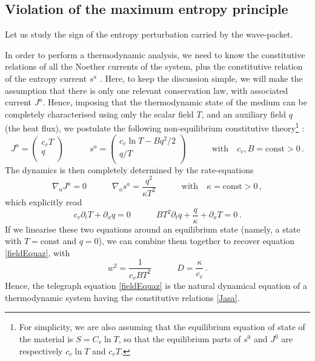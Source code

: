 \documentclass[a4paper, amsfonts, amssymb, amsmath, reprint, showkeys,  twoside, onecolumn,notitlepage,nofootinbib]{revtex4-1}
\newcommand{\spc}{\quad \quad \quad}
\theoremstyle{definition}
\theoremstyle{theorem}
\begin{document}
\subsection*{Violation of the maximum entropy principle}

Let us study the sign of the entropy perturbation carried by the wave-packet.

In order to perform a thermodynamic analysis, we need to know the constitutive relations of all the Noether currents of the system, plus the constitutive relation of the entropy current $s^a$ \cite{GavassinoLyapunov_2020,GavassinoGibbs2021,GavassinoCausality2021}. Here, to keep the discussion simple, we will make the assumption that there is only one relevant conservation law, with associated current $J^a$. Hence, imposing that the thermodynamic state of the medium can be completely characterised using only the scalar field $T$, and an auxiliary field $q$ (the heat flux), we postulate the following non-equilibrium constitutive theory\footnote{For simplicity, we are also assuming that the equilibrium equation of state of the material is $S=C_v \ln T$, so that the equilibrium parts of $s^0$ and $J^0$ are respectively $c_v \ln T$ and $c_v T$.} \cite{GavassinoUEIT2021}:
\begin{equation}\label{Jasa}
J^a = 
\begin{pmatrix}
c_v T   \\
q \\
\end{pmatrix}
\spc 
s^a =
\begin{pmatrix}
c_v \ln T -Bq^2/2  \\
q/T \\
\end{pmatrix}
\spc \text{with} \quad c_v,B = \text{const} >0 \, .
\end{equation}
The dynamics is then completely determined by the rate-equations
\begin{equation}\label{Fondamentali}
\nabla_a J^a =0  \spc \nabla_a s^a = \dfrac{q^2}{\kappa T^2} \spc \text{with} \quad \kappa=\text{const} >0 \, ,
\end{equation}
which explicitly read
\begin{equation}\label{buonalaprima}
c_v \partial_t T +\partial_x q =0  \spc BT^2 \partial_t q +\dfrac{q}{\kappa} +\partial_x T =0 \, .
\end{equation}
If we linearise these two equations around an equilibrium state (namely, a state with $T=\text{const}$ and $q=0$), we can combine them together to recover equation \eqref{fieldEquaz}, with
\begin{equation}\label{dsb5}
w^2 = \dfrac{1}{c_v B T^2}  \spc D = \dfrac{\kappa}{c_v} \, .
\end{equation}
Hence, the telegraph equation \eqref{fieldEquaz} is the natural dynamical equation of a thermodynamic system having the constitutive relations \eqref{Jasa}. 
\end{document}
